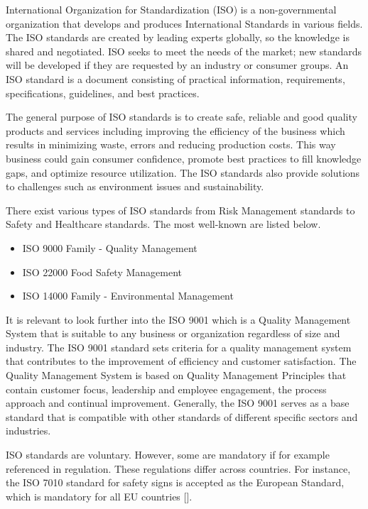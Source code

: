 International Organization for Standardization (ISO) is a non-governmental organization that develops and produces International Standards in various fields. The ISO standards are created by leading experts globally, so the knowledge is shared and negotiated. ISO seeks to meet the needs of the market; new standards will be developed if they are requested by an industry or consumer groups. An ISO standard is a document consisting of practical information, requirements, specifications, guidelines, and best practices. 

The general purpose of ISO standards is to create safe, reliable and good quality products and services including improving the efficiency of the business which results in minimizing waste, errors and reducing production costs. This way business could gain consumer confidence, promote best practices to fill knowledge gaps, and optimize resource utilization. The ISO standards also provide solutions to challenges such as environment issues and sustainability. 

There exist various types of ISO standards from Risk Management standards to Safety and Healthcare standards. The most well-known are listed below.

\begin{itemize}
	\item ISO 9000 Family - Quality Management
	\item ISO 22000 Food Safety Management
	\item ISO 14000 Family - Environmental Management

\end{itemize}

It is relevant to look further into the ISO 9001 which is a Quality Management System that is suitable to any business or organization regardless of size and industry. The ISO 9001 standard sets criteria for a quality management system that contributes to the improvement of efficiency and customer satisfaction. The Quality Management System is based on Quality Management Principles that contain customer focus, leadership and employee engagement, the process approach and continual improvement. Generally, the ISO 9001 serves as a base standard that is compatible with other standards of different specific sectors and industries.

ISO standards are voluntary. However, some are mandatory if for example referenced in regulation. These regulations differ across countries. For instance, the ISO 7010 standard for safety signs is accepted as the European Standard, which is mandatory for all EU countries [].

